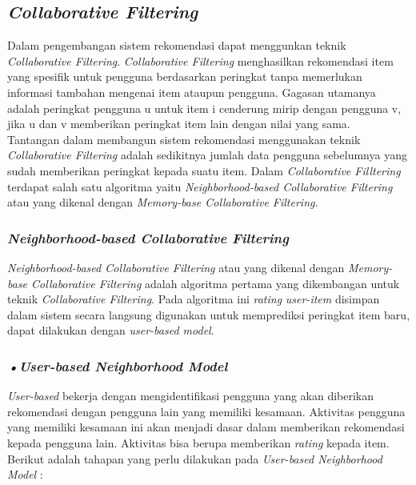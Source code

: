 \subsection{\textit{Collaborative Filtering}}
\label{sec:collaborative filtering}
	Dalam pengembangan sistem rekomendasi dapat menggunkan teknik \textit{Collaborative Filtering}. \textit{Collaborative Filtering} menghasilkan rekomendasi item yang spesifik untuk pengguna berdasarkan peringkat tanpa memerlukan informasi tambahan mengenai item ataupun pengguna. Gagasan utamanya adalah peringkat pengguna u untuk item i cenderung mirip dengan pengguna v, jika u dan v memberikan peringkat item lain dengan nilai yang sama. \\%
	Tantangan dalam membangun sistem rekomendasi menggunakan teknik \textit{Collaborative Filtering} adalah sedikitnya jumlah data pengguna sebelumnya yang sudah memberikan peringkat kepada suatu item. Dalam \textit{Collaborative Filltering} terdapat salah satu algoritma yaitu \textit{Neighborhood-based Collaborative Filtering} atau yang dikenal dengan \textit{Memory-base Collaborative Filtering}.
	
\subsubsection{\textit{Neighborhood-based Collaborative Filtering}}
\textit{Neighborhood-based Collaborative Filtering} atau yang dikenal dengan \textit{Memory-base Collaborative Filtering} adalah algoritma pertama yang dikembangan untuk teknik \textit{Collaborative Filtering}. Pada algoritma ini \textit{rating} \textit{user-item} disimpan dalam sistem secara langsung digunakan untuk memprediksi peringkat item baru, dapat dilakukan dengan \textit{user-based model}. %

\subsubsection{\textit{•User-based Neighborhood Model}}
\textit{User-based} bekerja dengan mengidentifikasi pengguna yang akan diberikan rekomendasi dengan pengguna lain yang memiliki kesamaan. Aktivitas pengguna yang memiliki kesamaan ini akan menjadi dasar dalam memberikan rekomendasi kepada pengguna lain. Aktivitas bisa berupa memberikan \textit{rating} kepada item. Berikut adalah tahapan yang perlu dilakukan pada \textit{User-based Neighborhood Model} : 

